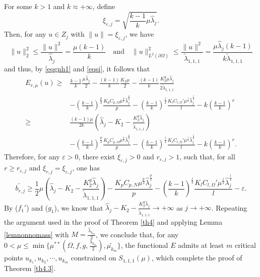 \documentclass[11pt]{amsart}
\newcommand{\norm}[1]{\lVert#1\rVert}
\numberwithin{equation}{section}
\begin{document}
For some $k>1$ and $k\approx +\infty$, define
    $$\xi_{\varepsilon,j}= \sqrt{\frac{k-1}{k}\mu\hat{\lambda}_{j}}.$$
Then, for any $u \in Z_j$ with $\norm{u}=\xi_{\varepsilon,j}$, we have
    $$
     \norm{u}^2_2 \leq \frac{\norm{u}^2}{\hat{\lambda}_{j}} = \frac{\mu(k-1)}{k} \quad \text{and} \quad \norm{u}^2_{L^2(\partial\Omega)}\leq\frac{\norm{u}^2}{\tilde{\lambda}_{1,1,1}} = \frac{\mu\hat{\lambda}_{j}(k-1)}{k\tilde{\lambda}_{1,1,1}}
    $$
and thus, by \eqref{eqgnh1} and \eqref{eqsi}, it follows that
$$
\begin{aligned}
    E_{r,\mu}(u)\geq &\frac{k-1}{k}\frac{\mu\hat{\lambda}_{j}}{2}-\frac{(k-1)}{k}\frac{K_2\mu}{2}-\frac{(k-1)}{k}\frac{K_2^g\mu\hat{\lambda}_j}{2\tilde{\lambda}_{1,1,1}}\\&
    -\left(\frac{k-1}{k}\right)^\frac{p}{2}\frac{K_pC_{p,\Omega}\mu^\frac{p}{2}\hat{\lambda}_{j}^\frac{p}{2}}{p}-\left(\frac{k-1}{k}\right)^\frac{l}{2}\frac{K_lC_{l,\Omega}'\mu^\frac{l}{2}\hat{\lambda}_{j}^\frac{l}{2}}{l}-k\left(\frac{k-1}{k}\right)^r\\
    \geq &\frac{(k-1)\mu}{2k}(\hat{\lambda}_{j}-K_2-\frac{K_2^g\hat{\lambda}_j}{\tilde{\lambda}_{1,1,1}})\\&
    -\left(\frac{k-1}{k}\right)^\frac{p}{2}\frac{K_pC_{p,\Omega}\mu^\frac{p}{2}\hat{\lambda}_{j}^\frac{p}{2}}{p}-\left(\frac{k-1}{k}\right)^\frac{l}{2}\frac{K_lC_{l,\Omega}'\mu^\frac{l}{2}\hat{\lambda}_{j}^\frac{l}{2}}{l}-k\left(\frac{k-1}{k}\right)^r.
\end{aligned}
$$
Therefore, for any $\varepsilon>0$, there exist $\xi_{\varepsilon,j}>0$ and $r_{\varepsilon,j}>1$, such that, for all $r\geq r_{\varepsilon,j}$ and $\xi_{r,j}=\xi_{\varepsilon,j}$, one has
$$
\widetilde{b_{r,j}}\geq\frac{1}{2}\mu(\hat{\lambda}_{j}-K_2-\frac{K_2^g\hat{\lambda}_j}{\tilde{\lambda}_{1,1,1}})-\frac{K_pC_{p,N}\mu^\frac{p}{2}\hat{\lambda}_{j}^\frac{p}{2}}{p}-\left(\frac{k-1}{k}\right)^\frac{l}{2}\frac{K_lC_{l,\Omega}'\mu^\frac{l}{2}\hat{\lambda}_{j}^\frac{l}{2}}{l}-\varepsilon.
$$
By ($f_1'$) and ($g_1$), we know that $\hat{\lambda}_{j}-K_2-\frac{K_2^g\hat{\lambda}_j}{\tilde{\lambda}_{1,1,1}} \to +\infty$ as $j \to +\infty$.
Repeating the argument used in the proof of Theorem \ref{th4} and applying Lemma \ref{lemnonnomass} with $M=\frac{\hat{\lambda}_{k_m}}{2}$, we conclude that, for any \linebreak $0<\mu\leq \min\{\mu^{**}(\Omega,f,g,\frac{\lambda_{k_m}}{2}), \widetilde{\mu_{k_m}}\}$,  the functional $E$ admits at least $m$ critical points $u_{k_1}, u_{k_2},\cdots,u_{k_m}$ constrained on $S_{1,1,1}(\mu)$, which complete the proof of Theorem \ref{th4.3}.
\end{document}
